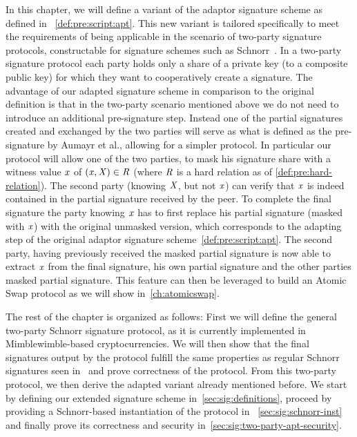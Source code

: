 In this chapter, we will define a variant of the adaptor signature scheme as defined in ~\cref{def:pre:script:apt}.
This new variant is tailored specifically to meet the requirements of being applicable in the scenario of two-party signature protocols, constructable for signature schemes such as Schnorr~\cite{maxwell2019simple}.
In a two-party signature protocol each party holds only a share of a private key (to a composite public key) for which they want to cooperatively create a signature.
The advantage of our adapted signature scheme in comparison to the original definition is that in the two-party scenario mentioned above we do not need to introduce an additional pre-signature step.
Instead one of the partial signatures created and exchanged by the two parties will serve as what is defined as the pre-signature by Aumayr et al., allowing for a simpler protocol.
In particular our protocol will allow one of the two parties, to mask his signature share with a witness value $\mathit{x}$ of $(\mathit{x}, \mathit{X}) \in \mathit{R}$ (where $\mathit{R}$ is a hard relation as of \cref{def:pre:hard-relation}).
The second party (knowing $\mathit{X}$, but not $\mathit{x}$) can verify that $\mathit{x}$ is indeed contained in the partial signature received by the peer.
To complete the final signature the party knowing $\mathit{x}$ has to first replace his partial signature (masked with $\mathit{x}$) with the original unmasked version, which corresponds to the adapting step of the original adaptor signature scheme~\cref{def:pre:script:apt}.
The second party, having previously received the masked partial signature is now able to extract $\mathit{x}$ from the final signature, his own partial signature and the other parties masked partial signature.
This feature can then be leveraged to build an Atomic Swap protocol as we will show in~\cref{ch:atomicswap}.

The rest of the chapter is organized as follows:
First we will define the general two-party Schnorr signature protocol, as it is currently implemented in Mimblewimble-based cryptocurrencies.
We will then show that the final signatures output by the protocol fulfill the same properties as regular Schnorr signatures seen in~\cite{schnorr1989efficient} and prove correctness of the protocol.
From this two-party protocol, we then derive the adapted variant already mentioned before.
We start by defining our extended signature scheme in~\cref{sec:sig:definitions}, proceed by providing a Schnorr-based instantiation of the protocol in ~\cref{sec:sig:schnorr-inst} and finally prove its correctness and security in~\cref{sec:sig:two-party-apt-security}.

